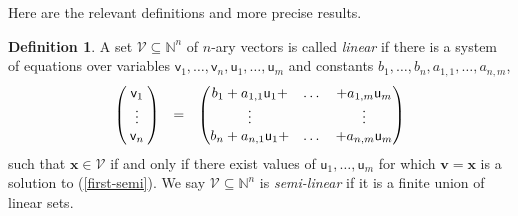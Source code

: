 \documentclass[12pt,oneside,reqno]{amsart}
\theoremstyle{definition}
\newtheorem{definition}{Definition}
\begin{document}
Here are the relevant definitions and more precise results.

 \begin{definition}A set $\mathcal{V}\subseteq \mathbb{N}^n$ of $n$-ary vectors is called \emph{linear} if there is a system of equations over variables $\mathsf{v}_1,\dots,\mathsf{v}_n,\mathsf{u}_1,\dots,\mathsf{u}_m$ and constants $b_1,\dots,b_n,a_{1,1},\dots,a_{n,m}$,  \begin{equation}
 \begin{pmatrix}
\;\mathsf{v}_1\;  \\
\vdots  \\
\mathsf{v}_n  
\end{pmatrix} \hspace{.1in}= \hspace{.1in}
 \begin{pmatrix}
b_1 + a_{1,1}\mathsf{u}_1 + & \dots  & + a_{1,m}\mathsf{u}_m  \\
 \vdots & & \vdots \\
b_n + a_{n,1}\mathsf{u}_1 + & \dots & +  a_{n,m}\mathsf{u}_m
\end{pmatrix}
\label{first-semi} \end{equation} such that $\mathbf{x} \in \mathcal{V}$ if and only if there exist values of $\mathsf{u}_1,\dots,\mathsf{u}_m$ for which $\mathbf{v}=\mathbf{x}$ is a solution to (\ref{first-semi}). We say $\mathcal{V} \subseteq \mathbb{N}^n$ is \emph{semi-linear} if it is a finite union of linear sets.\label{def:linear} \end{definition}
\end{document}
